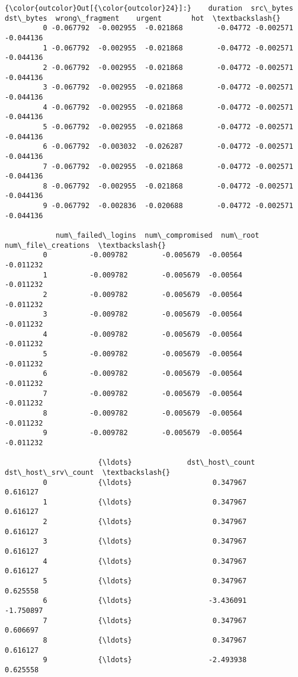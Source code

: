 \documentclass[11pt]{article}
\begin{document}
\begin{Verbatim}[commandchars=\\\{\}]
{\color{outcolor}Out[{\color{outcolor}24}]:}    duration  src\_bytes  dst\_bytes  wrong\_fragment    urgent       hot  \textbackslash{}
         0 -0.067792  -0.002955  -0.021868        -0.04772 -0.002571 -0.044136   
         1 -0.067792  -0.002955  -0.021868        -0.04772 -0.002571 -0.044136   
         2 -0.067792  -0.002955  -0.021868        -0.04772 -0.002571 -0.044136   
         3 -0.067792  -0.002955  -0.021868        -0.04772 -0.002571 -0.044136   
         4 -0.067792  -0.002955  -0.021868        -0.04772 -0.002571 -0.044136   
         5 -0.067792  -0.002955  -0.021868        -0.04772 -0.002571 -0.044136   
         6 -0.067792  -0.003032  -0.026287        -0.04772 -0.002571 -0.044136   
         7 -0.067792  -0.002955  -0.021868        -0.04772 -0.002571 -0.044136   
         8 -0.067792  -0.002955  -0.021868        -0.04772 -0.002571 -0.044136   
         9 -0.067792  -0.002836  -0.020688        -0.04772 -0.002571 -0.044136   
         
            num\_failed\_logins  num\_compromised  num\_root  num\_file\_creations  \textbackslash{}
         0          -0.009782        -0.005679  -0.00564           -0.011232   
         1          -0.009782        -0.005679  -0.00564           -0.011232   
         2          -0.009782        -0.005679  -0.00564           -0.011232   
         3          -0.009782        -0.005679  -0.00564           -0.011232   
         4          -0.009782        -0.005679  -0.00564           -0.011232   
         5          -0.009782        -0.005679  -0.00564           -0.011232   
         6          -0.009782        -0.005679  -0.00564           -0.011232   
         7          -0.009782        -0.005679  -0.00564           -0.011232   
         8          -0.009782        -0.005679  -0.00564           -0.011232   
         9          -0.009782        -0.005679  -0.00564           -0.011232   
         
                      {\ldots}             dst\_host\_count  dst\_host\_srv\_count  \textbackslash{}
         0            {\ldots}                   0.347967            0.616127   
         1            {\ldots}                   0.347967            0.616127   
         2            {\ldots}                   0.347967            0.616127   
         3            {\ldots}                   0.347967            0.616127   
         4            {\ldots}                   0.347967            0.616127   
         5            {\ldots}                   0.347967            0.625558   
         6            {\ldots}                  -3.436091           -1.750897   
         7            {\ldots}                   0.347967            0.606697   
         8            {\ldots}                   0.347967            0.616127   
         9            {\ldots}                  -2.493938            0.625558   
         

\end{Verbatim}
\end{document}

